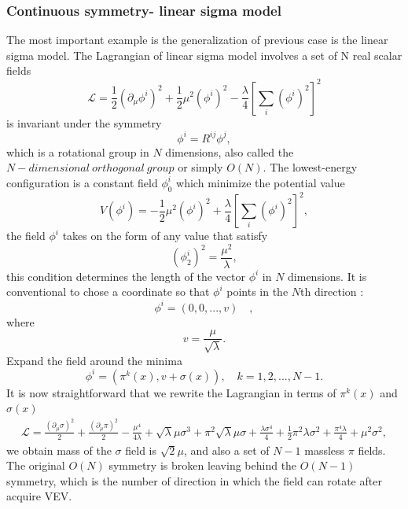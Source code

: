 \documentclass{report}
\numberwithin{equation}{section}
\begin{document}
\subsubsection{Continuous symmetry- linear sigma model}
The most important example is the generalization of previous case is the linear sigma model.
The Lagrangian of linear sigma model involves a set of N real scalar fields
\begin{equation}
\label{eqn:linear-ssbL}
\mathcal{L}=\frac{1}{2}(\partial_\mu\phi^i)^2+\frac{1}{2}\mu^2(\phi^i)^2-\frac{\lambda}{4}\left[\sum_i(\phi^i)^2\right]^2
\end{equation}
is invariant under the symmetry
\begin{equation}
\phi^i=R^{ij} \phi^j,
\end{equation}
which is a rotational group in $N$ dimensions, also called the $N-dimensional\ orthogonal\ group$ or simply $O(N)$. The lowest-energy configuration is a constant field $\phi_0^i$ which minimize the potential value
\begin{equation}
V(\phi^i)=
-\frac{1}{2}\mu^2(\phi^i)^2+\frac{\lambda}{4}\left[\sum_i(\phi^i)^2\right]^2,
\end{equation}
the field $\phi^i$ takes on the form of any value that satisfy
\begin{equation}
(\phi^i_2)^2=\frac{\mu^2}{\lambda},
\end{equation}
this condition determines the length of the vector $\phi^i$ in $N$ dimensions. It is conventional to chose a coordinate so that $\phi^i$ points in the $N$th direction :
\begin{equation}
\phi^i=(0,0,...,v) \quad,
\end{equation}
where
\begin{equation}
v=\frac{\mu}{\sqrt{\lambda}}.
\end{equation}
Expand the field around the minima
\begin{equation}
\phi^i=(\pi^k(x),v+\sigma(x)), \quad k=1,2,...,N-1.
\end{equation}
It is now straightforward that we rewrite the Lagrangian in terms of $\pi^k(x)$ and $\sigma(x)$
\begin{equation}
\begin{split}
\mathcal{L}=\frac{(\partial_\mu \sigma) ^2}{2}+\frac{( \partial_\mu \pi )^2}{2}-\frac{\mu ^4}{4 \lambda }+\sqrt{\lambda } \mu  \sigma ^3+\pi ^2 \sqrt{\lambda } \mu  \sigma +\frac{\lambda  \sigma ^4}{4}+\frac{1}{2} \pi ^2 \lambda  \sigma ^2+\frac{\pi ^4 \lambda }{4}+\mu ^2 \sigma ^2,
\end{split}
\end{equation}
we obtain mass of the $\sigma$ field is $\sqrt{2}\mu$, and also a set of $N-1$ massless $\pi$ fields. The original $O(N)$ symmetry is broken leaving behind the $O(N-1)$ symmetry, which is the number of direction in which the field can rotate after acquire VEV.
\end{document}
